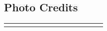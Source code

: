 \begin{flushleft}
\needspace{1.5cm}
\section{Photo Credits}
\begin{center}
\begin{supertabular}{p{0.76\linewidth}p{0.08\linewidth}}
 &  \\
\end{supertabular}
\end{center}
\end{flushleft}
\onecolumn
\clearpage